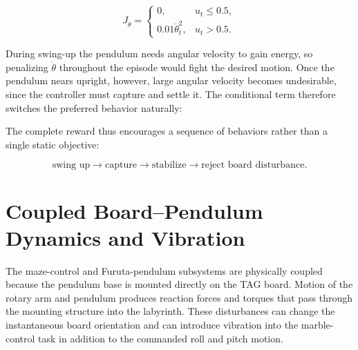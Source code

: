 \documentclass[9pt]{extarticle}
\begin{document}
\begin{equation}
J_{\dot{\theta}} =
\begin{cases}
0,
& u_t \leq 0.5,\\[1mm]
0.01\dot{\theta}_t^2,
& u_t > 0.5.
\end{cases}
\label{eq:pole_velocity_cost}
\end{equation}

During swing-up the pendulum needs angular velocity to gain energy, so
penalizing $\dot{\theta}$ throughout the episode would fight the desired
motion. Once the pendulum nears upright, however, large angular velocity
becomes undesirable, since the controller must capture and settle it. The
conditional term therefore switches the preferred behavior naturally:

\begin{center}
\end{center}

The complete reward thus encourages a sequence of behaviors rather than a
single static objective:

\begin{equation}
\boxed{
\text{swing up}
\rightarrow
\text{capture}
\rightarrow
\text{stabilize}
\rightarrow
\text{reject board disturbance}.
}
\end{equation}

\section{Coupled Board--Pendulum Dynamics and Vibration}
The maze-control and Furuta-pendulum subsystems are physically coupled because the pendulum base is mounted directly on the TAG board. Motion of the rotary arm and pendulum produces reaction forces and torques that pass through the mounting structure into the labyrinth. These disturbances can change the instantaneous board orientation and can introduce vibration into the marble-control task in addition to the commanded roll and pitch motion.
\end{document}
